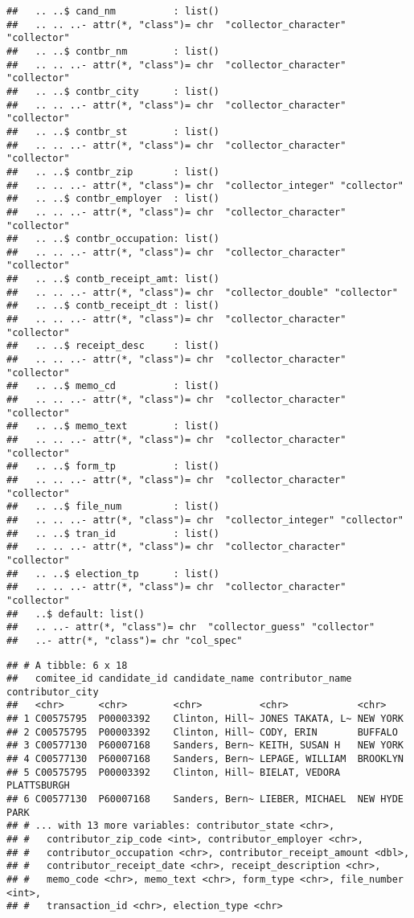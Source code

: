 \documentclass[]{article}
\begin{document}
\begin{verbatim}
##   .. ..$ cand_nm          : list()
##   .. .. ..- attr(*, "class")= chr  "collector_character" "collector"
##   .. ..$ contbr_nm        : list()
##   .. .. ..- attr(*, "class")= chr  "collector_character" "collector"
##   .. ..$ contbr_city      : list()
##   .. .. ..- attr(*, "class")= chr  "collector_character" "collector"
##   .. ..$ contbr_st        : list()
##   .. .. ..- attr(*, "class")= chr  "collector_character" "collector"
##   .. ..$ contbr_zip       : list()
##   .. .. ..- attr(*, "class")= chr  "collector_integer" "collector"
##   .. ..$ contbr_employer  : list()
##   .. .. ..- attr(*, "class")= chr  "collector_character" "collector"
##   .. ..$ contbr_occupation: list()
##   .. .. ..- attr(*, "class")= chr  "collector_character" "collector"
##   .. ..$ contb_receipt_amt: list()
##   .. .. ..- attr(*, "class")= chr  "collector_double" "collector"
##   .. ..$ contb_receipt_dt : list()
##   .. .. ..- attr(*, "class")= chr  "collector_character" "collector"
##   .. ..$ receipt_desc     : list()
##   .. .. ..- attr(*, "class")= chr  "collector_character" "collector"
##   .. ..$ memo_cd          : list()
##   .. .. ..- attr(*, "class")= chr  "collector_character" "collector"
##   .. ..$ memo_text        : list()
##   .. .. ..- attr(*, "class")= chr  "collector_character" "collector"
##   .. ..$ form_tp          : list()
##   .. .. ..- attr(*, "class")= chr  "collector_character" "collector"
##   .. ..$ file_num         : list()
##   .. .. ..- attr(*, "class")= chr  "collector_integer" "collector"
##   .. ..$ tran_id          : list()
##   .. .. ..- attr(*, "class")= chr  "collector_character" "collector"
##   .. ..$ election_tp      : list()
##   .. .. ..- attr(*, "class")= chr  "collector_character" "collector"
##   ..$ default: list()
##   .. ..- attr(*, "class")= chr  "collector_guess" "collector"
##   ..- attr(*, "class")= chr "col_spec"
\end{verbatim}

\begin{verbatim}
## # A tibble: 6 x 18
##   comitee_id candidate_id candidate_name contributor_name contributor_city
##   <chr>      <chr>        <chr>          <chr>            <chr>           
## 1 C00575795  P00003392    Clinton, Hill~ JONES TAKATA, L~ NEW YORK        
## 2 C00575795  P00003392    Clinton, Hill~ CODY, ERIN       BUFFALO         
## 3 C00577130  P60007168    Sanders, Bern~ KEITH, SUSAN H   NEW YORK        
## 4 C00577130  P60007168    Sanders, Bern~ LEPAGE, WILLIAM  BROOKLYN        
## 5 C00575795  P00003392    Clinton, Hill~ BIELAT, VEDORA   PLATTSBURGH     
## 6 C00577130  P60007168    Sanders, Bern~ LIEBER, MICHAEL  NEW HYDE PARK   
## # ... with 13 more variables: contributor_state <chr>,
## #   contributor_zip_code <int>, contributor_employer <chr>,
## #   contributor_occupation <chr>, contributor_receipt_amount <dbl>,
## #   contributor_receipt_date <chr>, receipt_description <chr>,
## #   memo_code <chr>, memo_text <chr>, form_type <chr>, file_number <int>,
## #   transaction_id <chr>, election_type <chr>
\end{verbatim}
\end{document}
